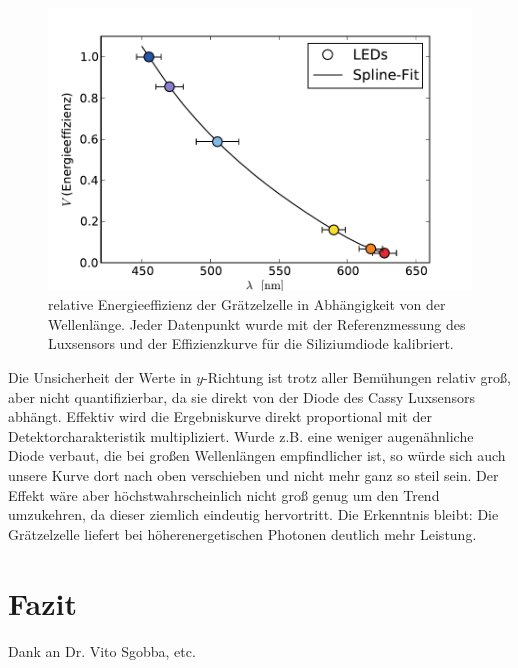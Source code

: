 \documentclass[11pt]{scrartcl}
\begin{document}
\begin{figure}[ht]
\begin{center}
\includegraphics[width=1.0\textwidth]{images/graetzel_lambda_korrigiert.pdf}
\end{center}
\vspace{-1.5\baselineskip}
\caption{relative Energieeffizienz der Grätzelzelle in Abhängigkeit von der Wellenlänge. Jeder Datenpunkt wurde mit der Referenzmessung des Luxsensors und der Effizienzkurve für die Siliziumdiode kalibriert.}
\label{lambda_korrigiert}
\end{figure}

Die Unsicherheit der Werte in $y$-Richtung ist trotz aller Bemühungen relativ groß, aber nicht quantifizierbar, da sie direkt von der Diode des Cassy Luxsensors abhängt. Effektiv wird die Ergebniskurve direkt proportional mit der Detektorcharakteristik multipliziert. Wurde z.B. eine weniger augenähnliche Diode verbaut, die bei großen Wellenlängen empfindlicher ist, so würde sich auch unsere Kurve dort nach oben verschieben und nicht mehr ganz so steil sein. Der Effekt wäre aber höchstwahrscheinlich nicht groß genug um den Trend umzukehren, da dieser ziemlich eindeutig hervortritt. Die Erkenntnis bleibt: Die Grätzelzelle liefert bei höherenergetischen Photonen deutlich mehr Leistung.


\section{Fazit}
Dank an Dr. Vito Sgobba, etc.
\end{document}
